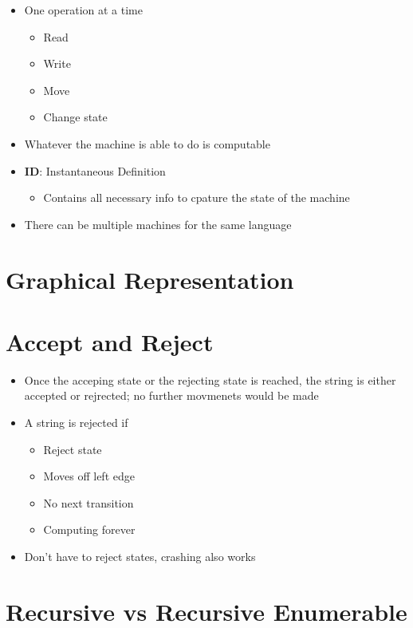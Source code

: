 \begin{itemize}
  \item One operation at a time
  \begin{itemize}
    \item Read
    \item Write
    \item Move
    \item Change state
  \end{itemize}

  \item Whatever the machine is able to do is computable
  \item \textbf{ID}: Instantaneous Definition
  \begin{itemize}
    \item Contains all necessary info to cpature the state of the machine
  \end{itemize}

  \item There can be multiple machines for the same language
\end{itemize}

\section{Graphical Representation}

\section{Accept and Reject}

  \begin{itemize}
    \item Once the acceping state or the rejecting state is reached,
    the string is either accepted or rejrected; no further movmenets would
    be made
    \item A string is rejected if
    \begin{itemize}
      \item Reject state
      \item Moves off left edge
      \item No next transition
      \item Computing forever
    \end{itemize}

    \item Don't have to reject states, crashing also works
  \end{itemize}

\section{Recursive vs Recursive Enumerable}

